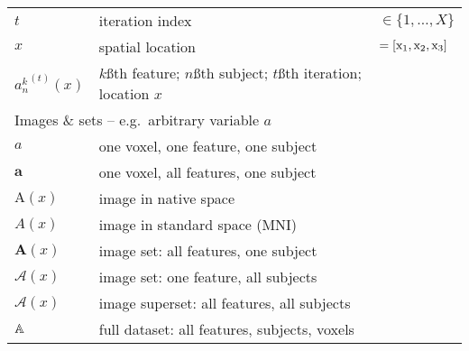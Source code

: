 \begin{singlespacing}
\begin{table}[H]
\begin{tabular}{lll}
  	$t$                   & iteration index                              & $\in \{1,\dots,X\}$ \\
  	$x$                   & spatial location                             & $= [\mathrm{x}_1,\mathrm{x}_2,\mathrm{x}_3]$          \\
   	${a_n^k}^{(t)}(x)$&$k$\ss{th} feature; $n$\ss{th} subject; $t$\ss{th} iteration; location $x$&\\
    \midrule
  	\multicolumn{3}{l}{Images \& sets -- e.g.\ arbitrary variable $a$}                         \\
    \midrule
  	$a$                   & one voxel, one feature, one subject          &                     \\
  	$\bm{a}$              & one voxel, all features, one subject         &                     \\
  	$\mathrm{A}(x)$       & image in native space                        &                     \\
  	$A(x)$                & image in standard space (MNI)                &                     \\
  	$\bm{A}(x)$           & image set: all features, one subject         &                     \\
  	$\mathcal{A}(x)$      & image set: one feature, all subjects         &                     \\
  	$\bm{\mathcal{A}}(x)$ & image superset: all features, all subjects   &                     \\
  	$\mathbb{A}$             & full dataset: all features, subjects, voxels &                     \\
    \bottomrule
  \end{tabular}
\end{table}
\end{singlespacing}
\clearpage
{}
\setcounter{page}{1}
